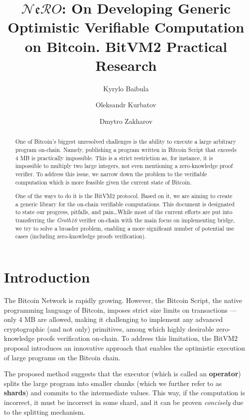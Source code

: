 \documentclass{iacrtrans}
\author{Kyrylo Baibula \inst{1} \and Oleksandr Kurbatov\inst{1} \and
Dmytro Zakharov\inst{1}}
\institute{Distributed Lab
  \email{dmytro.zakharov@distributedlab.com},
\email{ok@distributedlab.com}, \email{kyrylo.baybula@distributedlab.com}}
\title[Verifiable Computation on Bitcoin]{$\mathcal{N}\mathfrak{e}\mathcal{R}O$: On Developing Generic Optimistic Verifiable Computation on Bitcoin. BitVM2 Practical Research}
\begin{document}
\maketitle


\begin{abstract}
  One of Bitcoin's biggest unresolved challenges is the ability to execute 
  a large arbitrary program on-chain. Namely, publishing a program written in 
  Bitcoin Script that exceeds 4 MB is practically impossible. 
  This is a strict restriction as, for instance, it 
  is impossible to multiply two large integers, 
  not even mentioning a zero-knowledge proof verifier. To
  address this issue, we narrow down the problem to the verifiable computation
  which is more feasible given the current state of Bitcoin.

  One of the ways to do it is the BitVM2 protocol. Based on it, we are aiming to create a generic library for the on-chain verifiable computations. This document is designated to state our progress, pitfalls, and pain\ldots While most of the current efforts are put into transferring the \textit{Groth16} verifier on-chain with the main focus on implementing bridge, we try to solve a broader problem, enabling a more significant number of potential use cases (including zero-knowledge proofs verification).
\end{abstract}

\setcounter{tocdepth}{2}
\tableofcontents

\section{Introduction}\label{sec:intro}

The Bitcoin Network \autocite{bitcoin_paper} is rapidly growing. However, the Bitcoin Script, the native programming language of Bitcoin, imposes strict size limits on transactions --- only 4 MB are allowed, making it challenging to implement any advanced cryptographic (and not only) primitives, among which highly desirable zero-knowledge proofs verification on-chain. To address this limitation, the BitVM2 \autocite{bitvm2} proposal introduces an innovative approach that enables the optimistic execution of large programs on the Bitcoin chain. 

The proposed method suggests that the executor (which is called an \textbf{operator}) splits the large program into smaller chunks (which we further refer to as \textbf{shards}) and commits to the intermediate values. This way, if the computation is incorrect, it must be incorrect in some shard, and it can be proven \textit{concisely} due to the splitting mechanism.
\end{document}
